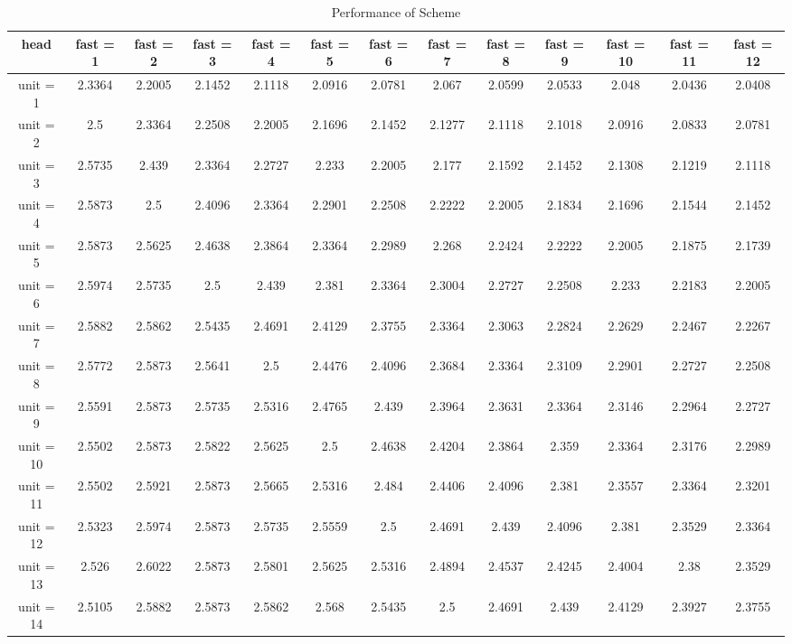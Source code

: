 \begin{table*}[ht]
\tabcolsep=0.11cm
\tiny
\caption{Performance of Scheme} 
\label{performance-table}
\begin{tabular}{|c|c|c|c|c|c|c|c|c|c|c|c|c|}
\hline
head &  fast = 1 & fast = 2 & fast = 3 & fast = 4 & fast = 5 & fast = 6 & fast = 7 & fast = 8 & fast = 9 & fast = 10 & fast = 11 & fast = 12 \\ \hline
unit = 1 &
2.3364 & 2.2005 & 2.1452 & 2.1118 & 2.0916 & 2.0781 & 2.067 & 2.0599 & 2.0533 & 2.048 & 2.0436 & 2.0408 \\
\hline
unit = 2 &
2.5 & 2.3364 & 2.2508 & 2.2005 & 2.1696 & 2.1452 & 2.1277 & 2.1118 & 2.1018 & 2.0916 & 2.0833 & 2.0781 \\
\hline
unit = 3 &
2.5735 & 2.439 & 2.3364 & 2.2727 & 2.233 & 2.2005 & 2.177 & 2.1592 & 2.1452 & 2.1308 & 2.1219 & 2.1118 \\
\hline
unit = 4 &
2.5873 & 2.5 & 2.4096 & 2.3364 & 2.2901 & 2.2508 & 2.2222 & 2.2005 & 2.1834 & 2.1696 & 2.1544 & 2.1452 \\
\hline
unit = 5 &
2.5873 & 2.5625 & 2.4638 & 2.3864 & 2.3364 & 2.2989 & 2.268 & 2.2424 & 2.2222 & 2.2005 & 2.1875 & 2.1739 \\
\hline
unit = 6 &
2.5974 & 2.5735 & 2.5 & 2.439 & 2.381 & 2.3364 & 2.3004 & 2.2727 & 2.2508 & 2.233 & 2.2183 & 2.2005 \\
\hline
unit = 7 &
2.5882 & 2.5862 & 2.5435 & 2.4691 & 2.4129 & 2.3755 & 2.3364 & 2.3063 & 2.2824 & 2.2629 & 2.2467 & 2.2267 \\
\hline
unit = 8 &
2.5772 & 2.5873 & 2.5641 & 2.5 & 2.4476 & 2.4096 & 2.3684 & 2.3364 & 2.3109 & 2.2901 & 2.2727 & 2.2508 \\
\hline
unit = 9 &
2.5591 & 2.5873 & 2.5735 & 2.5316 & 2.4765 & 2.439 & 2.3964 & 2.3631 & 2.3364 & 2.3146 & 2.2964 & 2.2727 \\
\hline
unit = 10 &
2.5502 & 2.5873 & 2.5822 & 2.5625 & 2.5 & 2.4638 & 2.4204 & 2.3864 & 2.359 & 2.3364 & 2.3176 & 2.2989 \\
\hline
unit = 11 &
2.5502 & 2.5921 & 2.5873 & 2.5665 & 2.5316 & 2.484 & 2.4406 & 2.4096 & 2.381 & 2.3557 & 2.3364 & 2.3201 \\
\hline
unit = 12 &
2.5323 & 2.5974 & 2.5873 & 2.5735 & 2.5559 & 2.5 & 2.4691 & 2.439 & 2.4096 & 2.381 & 2.3529 & 2.3364 \\
\hline
unit = 13 &
2.526 & 2.6022 & 2.5873 & 2.5801 & 2.5625 & 2.5316 & 2.4894 & 2.4537 & 2.4245 & 2.4004 & 2.38 & 2.3529 \\
\hline
unit = 14 &
2.5105 & 2.5882 & 2.5873 & 2.5862 & 2.568 & 2.5435 & 2.5 & 2.4691 & 2.439 & 2.4129 & 2.3927 & 2.3755 \\

\end{tabular}
\end{table*}
